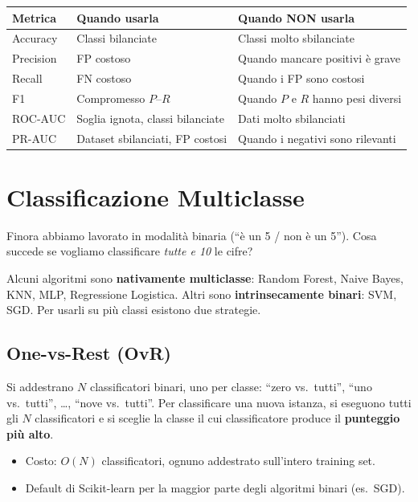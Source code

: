 \begin{center}
\renewcommand{\arraystretch}{1.3}
\begin{tabular}{@{} l p{6cm} p{6cm} @{}}
\toprule
\textbf{Metrica} & \textbf{Quando usarla} & \textbf{Quando NON usarla} \\
\midrule
Accuracy & Classi bilanciate & Classi molto sbilanciate \\
Precision & FP costoso & Quando mancare positivi è grave \\
Recall & FN costoso & Quando i FP sono costosi \\
F1 & Compromesso $P$--$R$ & Quando $P$ e $R$ hanno pesi diversi \\
ROC-AUC & Soglia ignota, classi bilanciate & Dati molto sbilanciati \\
PR-AUC & Dataset sbilanciati, FP costosi & Quando i negativi sono rilevanti \\
\bottomrule
\end{tabular}
\end{center}

\section{Classificazione Multiclasse}

Finora abbiamo lavorato in modalità binaria (``è un 5 / non è un 5''). Cosa succede se vogliamo classificare \emph{tutte e 10} le cifre?

Alcuni algoritmi sono \textbf{nativamente multiclasse}: Random Forest, Naive Bayes, KNN, MLP, Regressione Logistica. Altri sono \textbf{intrinsecamente binari}: SVM, SGD. Per usarli su più classi esistono due strategie.

\subsection{One-vs-Rest (OvR)}

Si addestrano $N$ classificatori binari, uno per classe: ``zero vs.\ tutti'', ``uno vs.\ tutti'', \ldots, ``nove vs.\ tutti''. Per classificare una nuova istanza, si eseguono tutti gli $N$ classificatori e si sceglie la classe il cui classificatore produce il \textbf{punteggio più alto}.

\begin{itemize}
    \item Costo: $O(N)$ classificatori, ognuno addestrato sull'intero training set.
    \item Default di Scikit-learn per la maggior parte degli algoritmi binari (es.\ SGD).
\end{itemize}

